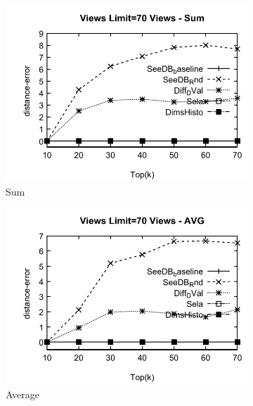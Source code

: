 \begin{figure}[h]
  \begin{subfigure}[b]{0.32\textwidth}
    \includegraphics[width=\textwidth]{SumD1.pdf}
    \caption{Sum   }
        \label{fig:SumD1}%
  \end{subfigure}
  \begin{subfigure}[b]{0.32\textwidth}
    \includegraphics[width=\textwidth]{AvgD1.pdf}
     \caption{Average  }
        \label{fig:AvgD1}
  \end{subfigure}
  \begin{subfigure}[b]{0.32\textwidth}

\end{subfigure}
\end{figure}
